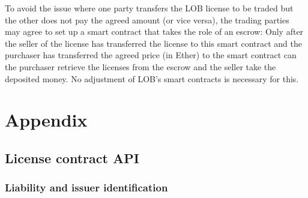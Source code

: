 \documentclass[a4paper]{article}
\begin{document}
To avoid the issue where one party transfers the LOB license to be traded but the other does not pay the agreed amount (or vice versa), the trading parties may agree to set up a smart contract that takes the role of an escrow: Only after the seller of the license has transferred the license to this smart contract and the purchaser has transferred the agreed price (in Ether) to the smart contract can the purchaser retrieve the licenses from the escrow and the seller take the deposited money. No adjustment of LOB's smart contracts is necessary for this.





\clearpage

\section{Appendix}

\subsection{License contract API}
\label{ch:licenseContractAPI}

\subsubsection{Liability and issuer identification}
\end{document}
